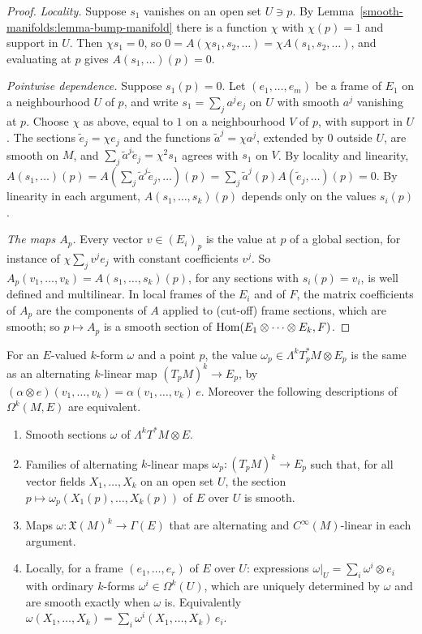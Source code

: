 \begin{proof}
\emph{Locality.} Suppose $s_1$ vanishes on an open set $U \ni p$. By Lemma~\ref{smooth-manifolds:lemma-bump-manifold} there is a function $\chi$ with $\chi(p) = 1$ and support
in $U$. Then $\chi s_1 = 0$, so $0 = A(\chi s_1, s_2, \ldots) = \chi A(s_1, s_2, \ldots)$, and evaluating at $p$ gives $A(s_1, \ldots)(p) = 0$.

\emph{Pointwise dependence.} Suppose $s_1(p) = 0$. Let $(e_1, \ldots, e_m)$ be a frame of $E_1$ on a neighbourhood $U$ of $p$, and write $s_1 = \sum_ja^je_j$ on $U$ with smooth
$a^j$ vanishing at $p$. Choose $\chi$ as above, equal to $1$ on a neighbourhood $V$ of $p$, with support in $U$. The sections $\tilde e_j = \chi e_j$ and the functions
$\tilde a^j = \chi a^j$, extended by $0$ outside $U$, are smooth on $M$, and $\sum_j\tilde a^j\tilde e_j = \chi^2s_1$ agrees with $s_1$ on $V$. By locality and linearity,
$A(s_1, \ldots)(p) = A(\sum_j\tilde a^j\tilde e_j, \ldots)(p) = \sum_j\tilde a^j(p)A(\tilde e_j, \ldots)(p) = 0$. By linearity in each argument, $A(s_1, \ldots, s_k)(p)$ depends only
on the values $s_i(p)$.

\emph{The maps $A_p$.} Every vector $v \in (E_i)_p$ is the value at $p$ of a global section, for instance of $\chi\sum_jv^je_j$ with constant coefficients $v^j$. So
$A_p(v_1, \ldots, v_k) = A(s_1, \ldots, s_k)(p)$, for any sections with $s_i(p) = v_i$, is well defined and multilinear. In local frames of the $E_i$ and of $F$, the matrix
coefficients of $A_p$ are the components of $A$ applied to (cut-off) frame sections, which are smooth; so $p \mapsto A_p$ is a smooth section of
$\operatorname{Hom}(E_1 \otimes \cdots \otimes E_k, F)$.
\end{proof}

\begin{proposition}\label{connections:proposition-bundle-valued-forms}
For an $E$-valued $k$-form $\omega$ and a point $p$, the value $\omega_p \in \Lambda^kT_p^*M \otimes E_p$ is the same as an alternating $k$-linear map $(T_pM)^k \to E_p$, by
$(\alpha \otimes e)(v_1, \ldots, v_k) = \alpha(v_1, \ldots, v_k)\,e$. Moreover the following descriptions of $\Omega^k(M, E)$ are equivalent.
\begin{enumerate}
\item Smooth sections $\omega$ of $\Lambda^kT^*M \otimes E$.
\item Families of alternating $k$-linear maps $\omega_p \colon (T_pM)^k \to E_p$ such that, for all vector fields $X_1, \ldots, X_k$ on an open set $U$, the section
$p \mapsto \omega_p(X_1(p), \ldots, X_k(p))$ of $E$ over $U$ is smooth.
\item Maps $\omega \colon \mathfrak{X}(M)^k \to \Gamma(E)$ that are alternating and $C^\infty(M)$-linear in each argument.
\item Locally, for a frame $(e_1, \ldots, e_r)$ of $E$ over $U$: expressions $\omega|_U = \sum_i\omega^i \otimes e_i$ with ordinary $k$-forms $\omega^i \in \Omega^k(U)$, which
are uniquely determined by $\omega$ and are smooth exactly when $\omega$ is. Equivalently $\omega(X_1, \ldots, X_k) = \sum_i\omega^i(X_1, \ldots, X_k)\,e_i$.
\end{enumerate}
\end{proposition}

